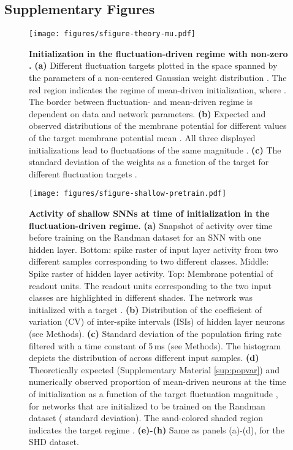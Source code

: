 \documentclass[11pt,a4paper]{article}
\begin{document}
\begin{refsection}

\renewcommand{\thefigure}{S\arabic{figure}}
\setcounter{figure}{0}    

\renewcommand{\thetable}{S\arabic{table}}
\setcounter{table}{0}    

\renewcommand{\thesubsection}{S\arabic{subsection}}  



\clearpage
\section*{Supplementary Figures}

\begin{figure}[htb]
	\texttt{[image: figures/sfigure-theory-mu.pdf]}
\caption{\textbf{Initialization in the fluctuation-driven regime with non-zero .}
	\textbf{(a)} Different fluctuation targets  plotted in the space spanned by the parameters of a non-centered Gaussian weight distribution . The red region indicates the regime of mean-driven initialization, where . The border between fluctuation- and mean-driven regime is dependent on data and network parameters.
	\textbf{(b)} Expected and observed distributions of the membrane potential for different values of the target membrane potential mean . All three displayed initializations lead to fluctuations of the same magnitude .
	\textbf{(c)} The standard deviation of the weights  as a function of the target  for different fluctuation targets .
}
\label{sfig:theory-mu}
\end{figure}



\begin{figure}[htb]
	\texttt{[image: figures/sfigure-shallow-pretrain.pdf]}
\caption{
\textbf{Activity of shallow \acp{SNN} at time of initialization in the fluctuation-driven regime.}
	\textbf{(a)} Snapshot of activity over time before training  on the Randman dataset for an \ac{SNN} with one hidden layer. Bottom: spike raster of input layer activity from two different samples corresponding to two different classes. Middle: Spike raster of hidden layer activity. Top: Membrane potential of readout units. The readout units corresponding to the two input classes are highlighted in different shades. The network was initialized with a target .
	\textbf{(b)} Distribution of the coefficient of variation (CV) of inter-spike intervals (ISIs) of hidden layer neurons (see Methods).
	\textbf{(c)} Standard deviation of the population firing rate filtered with a time constant of 5\,ms (see Methods). The histogram depicts the distribution of  across different input samples. 
	\textbf{(d)} Theoretically expected (Supplementary Material \ref{sup:popvar}) and numerically observed proportion of mean-driven neurons at the time of initialization as a function of the target fluctuation magnitude , for networks that are initialized to be trained on the Randman dataset ( standard deviation). The sand-colored shaded region indicates the target regime .
	\textbf{(e)-(h)} Same as panels (a)-(d), for the SHD dataset.
}
\label{sfig:shallow}
\end{figure}


\end{refsection}
\end{document}
